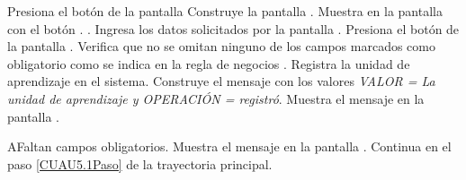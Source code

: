 	\begin{UCtrayectoria}
		\UCpaso[\UCactor] Presiona el botón  de la pantalla 
		\UCpaso[\UCsist] Construye la pantalla .
		\UCpaso[\UCsist] Muestra en la pantalla  con el botón . \label{CUU5.1:uaRegistrar}.
		\UCpaso[\UCactor] Ingresa los datos solicitados por la pantalla .\label{CUAU5.1Paso}
		\UCpaso[\UCactor] Presiona el botón  de la pantalla .
		\UCpaso[\UCsist] Verifica que no se omitan ninguno de los campos marcados como obligatorio como se indica en la regla de negocios . 
		\UCpaso[\UCsist] Registra la unidad de aprendizaje en el sistema.
		\UCpaso[\UCsist] Construye el mensaje  con los valores \textit{VALOR = La unidad de aprendizaje y OPERACIÓN = registró}.
		\UCpaso[\UCsist] Muestra el mensaje  en la pantalla .
	 	\end{UCtrayectoria}
	
	\begin{UCtrayectoriaA}{A}{Faltan campos obligatorios.}
		\UCpaso[\UCsist] Muestra el mensaje  en la pantalla  .
		\UCpaso[] Continua en el paso \ref{CUAU5.1Paso} de la trayectoria principal.
	\end{UCtrayectoriaA}
	

	

	
	
	
	
